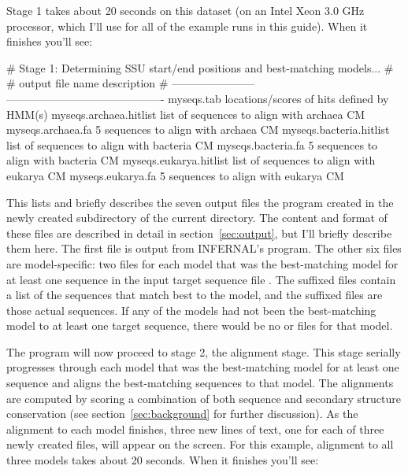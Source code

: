 Stage 1 takes about 20 seconds on this dataset (on an Intel Xeon 3.0
GHz processor, which I'll use for all of the example runs in this
guide). When it finishes you'll see: 

\begin{sreoutput}
# Stage 1: Determining SSU start/end positions and best-matching models...
#
# output file name         description                                
# -----------------------  -------------------------------------------
  myseqs.tab               locations/scores of hits defined by HMM(s)
  myseqs.archaea.hitlist   list of sequences to align with archaea CM
  myseqs.archaea.fa              5 sequences to align with archaea CM
  myseqs.bacteria.hitlist  list of sequences to align with bacteria CM
  myseqs.bacteria.fa             5 sequences to align with bacteria CM
  myseqs.eukarya.hitlist   list of sequences to align with eukarya CM
  myseqs.eukarya.fa              5 sequences to align with eukarya CM
\end{sreoutput}

This lists and briefly describes the seven output files the program created
in the newly created  subdirectory of the current directory.
The content and format of these files are described
in detail in section~\ref{sec:output}, but I'll briefly describe them 
here. The first file  is output from
INFERNAL's  program. The other six files are
model-specific: two files for each model that was the best-matching
model for at least one sequence in the input target sequence file
. The  suffixed files contain a list
of the sequences that match best to the model, and the 
suffixed files are those actual sequences. If any of the models had
not been the best-matching model to at least one target sequence,
there would be no  or  files for that
model.

The program will now proceed to stage 2, the alignment stage. This
stage serially progresses through each model that was the
best-matching model for at least one sequence and aligns the
best-matching sequences to that model. The alignments are computed by
scoring a combination of both sequence and secondary structure
conservation (see section~\ref{sec:background} for further
discussion). 
As the alignment to each model finishes, three new lines
of text, one for each of three newly created files, will appear on the
screen. For this example, alignment to all three models takes about 20
seconds. When it finishes you'll see:

